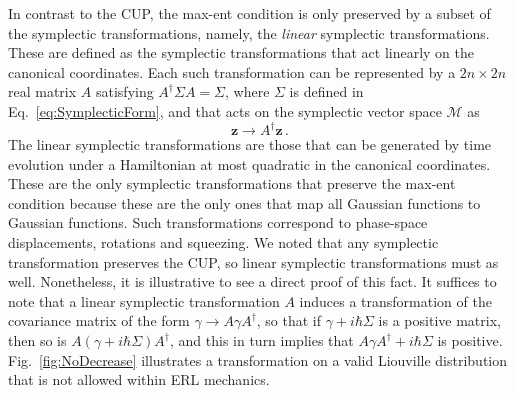 \documentclass[pra,superscriptaddress,nofootinbib,12pt]{revtex4-2}
\begin{document}
In contrast to the CUP, the max-ent condition is only preserved by a subset of the symplectic transformations, namely, the \emph{linear} symplectic transformations.
These are defined as the symplectic transformations that act linearly on the canonical coordinates.  Each such transformation can be represented by a $2n \times 2n$ real matrix $A$ satisfying $A^\dag \Sigma A = \Sigma$, where $\Sigma$ is defined in Eq.~\eqref{eq:SymplecticForm}, and that acts on the symplectic vector space $\mathcal{M}$ as
\begin{equation}
\mathbf{z} \rightarrow A^\dag \mathbf{z}\,.
\end{equation}
 The linear symplectic transformations are those that can be generated by time evolution under a Hamiltonian at most quadratic in the canonical coordinates.  These are the only symplectic transformations that preserve the max-ent condition because these are the only ones that map all Gaussian functions to Gaussian functions.  Such transformations correspond to phase-space displacements, rotations and squeezing.
We noted that any symplectic transformation preserves the CUP, so linear symplectic transformations must as well.  Nonetheless, it is illustrative to see a direct proof of this fact. It suffices to note that a linear symplectic transformation $A$ induces a transformation of the covariance matrix of the form $\gamma \to A\gamma A^{\dag}$, so that if $\gamma +i\hbar\Sigma$ is a positive matrix, then so is $A(\gamma +i\hbar\Sigma)A^{\dag}$, and this in turn implies that $A\gamma A^{\dag} +i\hbar\Sigma$ is positive.  Fig.~\ref{fig:NoDecrease} illustrates a transformation on a valid Liouville distribution that is not allowed within ERL mechanics.
\end{document}
